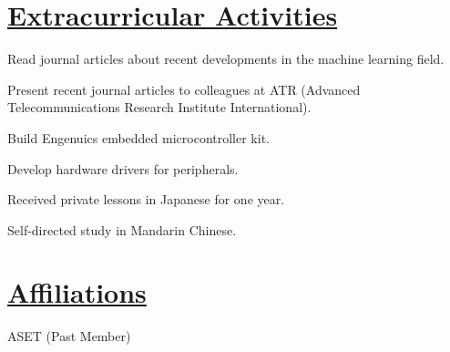\documentclass[a4paper, 11pt]{article}
\begin{document}
\section{\underline{Extracurricular Activities}}
  \begin{description}[leftmargin=0pt]
    \item[ATR Machine Learning Club] \hfill
      \begin{itemize*}
        \item Read journal articles about recent developments in the machine learning field.
        \item Present recent journal articles to colleagues at ATR (Advanced Telecommunications Research Institute International).
      \end{itemize*}
    \item[Microprocessor Group] \hfill
      \begin{itemize*}
        \item Build Engenuics embedded microcontroller kit.
        \item Develop hardware drivers for peripherals.
      \end{itemize*}
    \item[Language Learning] \hfill
      \begin{itemize*}
        \item Received private lessons in Japanese for one year.
        \item Self-directed study in Mandarin Chinese.
      \end{itemize*}
  \end{description}
    
\section{\underline{Affiliations}}
  \begin{itemize*}
    \item ASET (Past Member)
  \end{itemize*}
\end{document}
